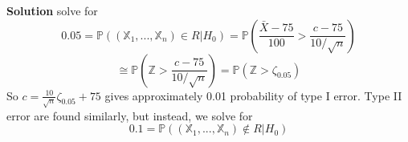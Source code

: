 \textbf{Solution} solve for
$$0.05 = \mathbb{P}((\mathbb{X}_1, ..., \mathbb{X}_n)\in R | H_0) = \mathbb{P}(\frac{\bar{X} - 75}{100} > \frac{c-75}{10/\sqrt{n}}) $$
$$\cong \mathbb{P}(\mathbb{Z} > \frac{c-75}{10/\sqrt{n}}) = \mathbb{P}(\mathbb{Z} > \zeta_{0.05}) $$
So $c = \frac{10}{\sqrt{n}}\zeta_{0.05} + 75$ gives approximately 0.01 probability of type I error. Type II error are found similarly, but instead, we solve for $$0.1 = \mathbb{P}((\mathbb{X}_1, ..., \mathbb{X}_n)\notin R | H_0)$$
